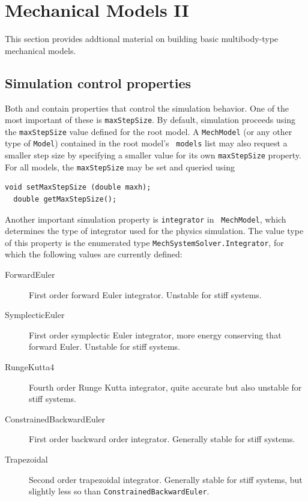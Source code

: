 \section{Mechanical Models II}
\label{MechModelsII:sec}

This section provides addtional material on building basic
multibody-type mechanical models.

\subsection{Simulation control properties}

Both  and
 contain properties
that control the simulation behavior. One of the most important of
these is {\tt maxStepSize}. By default, simulation proceeds using the
{\tt maxStepSize} value defined for the root model. A {\tt MechModel}
(or any other type of {\tt Model}) contained in the root model's {\tt
models} list may also request a smaller step size by specifying a
smaller value for its own {\tt maxStepSize} property.  For all models,
the {\tt maxStepSize} may be set and queried using
%
\begin{lstlisting}[]
  void setMaxStepSize (double maxh);
  double getMaxStepSize();
\end{lstlisting}
%

Another important simulation property is {\tt integrator} in {\tt
MechModel}, which determines the type of integrator used for the
physics simulation. The value type of this property is the enumerated
type {\tt MechSystemSolver.Integrator}, for which the following values
are currently defined:

\begin{description}

\item[ForwardEuler]\mbox{}

First order forward Euler integrator. Unstable for stiff systems.

\item[SymplecticEuler]\mbox{}

First order symplectic Euler integrator, more energy conserving
that forward Euler. Unstable for stiff systems.

\item[RungeKutta4]\mbox{}

Fourth order Runge Kutta integrator, quite accurate but also unstable
for stiff systems.

\item[ConstrainedBackwardEuler]\mbox{}

First order backward order integrator. Generally stable for stiff systems.

\item[Trapezoidal]\mbox{}

Second order trapezoidal integrator. Generally stable for stiff
systems, but slightly less so than {\tt ConstrainedBackwardEuler}.

\end{description}

